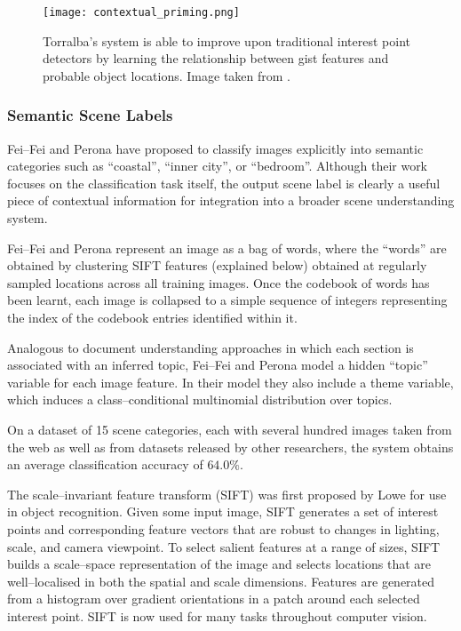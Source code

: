 \begin{figure}[htp]
\centering
\texttt{[image: contextual\_priming.png]}
\caption{Torralba's system \cite{Torralba03} is able to improve upon
  traditional interest point detectors by learning the relationship
  between gist features and probable object locations. Image taken from
  \cite{Torralba03}.}
\label{fig:contextual-priming}
\end{figure}

\subsubsection{Semantic Scene Labels}

Fei--Fei and Perona \cite{Fei-fei05} have proposed to classify images
explicitly into semantic categories such as ``coastal'', ``inner
city'', or ``bedroom''. Although their work focuses on the
classification task itself, the output scene label is clearly a useful
piece of contextual information for integration into a broader scene
understanding system.

Fei--Fei and Perona represent an image as a bag of words, where the
``words'' are obtained by clustering SIFT features (explained below)
obtained at regularly sampled locations across all training
images. Once the codebook of words has been learnt, each image is
collapsed to a simple sequence of integers representing the index of
the codebook entries identified within it.

Analogous to document understanding approaches in which each section
is associated with an inferred topic, Fei--Fei and Perona model a
hidden ``topic'' variable for each image feature. In their model they
also include a theme variable, which induces a class--conditional
multinomial distribution over topics.

On a dataset of 15 scene categories, each with several hundred images
taken from the web as well as from datasets released by other
researchers, the system obtains an average classification accuracy of
$64.0\%$.

The scale--invariant feature transform (SIFT) was first proposed by
Lowe \cite{Lowe99} for use in object recognition. Given some input
image, SIFT generates a set of interest points and corresponding
feature vectors that are robust to changes in lighting, scale, and
camera viewpoint. To select salient features at a range of sizes, SIFT
builds a scale--space representation of the image \cite{Lindeberg93}
and selects locations that are well--localised in both the spatial and
scale dimensions. Features are generated from a histogram over
gradient orientations in a patch around each selected interest
point. SIFT is now used for many tasks throughout computer vision.

